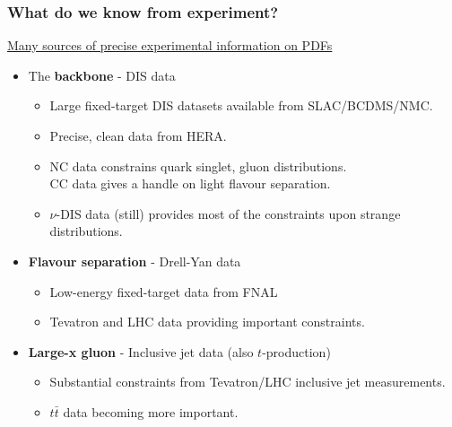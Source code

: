 \documentclass[10pt]{beamer}
\begin{document}
\begin{frame}
\frametitle{What do we know from experiment?}
\small\underline{Many sources of precise experimental information on PDFs}
\vskip5pt

\begin{itemize}
\item The \textbf{backbone} - DIS data

\begin{itemize}
\item Large fixed-target DIS datasets available from SLAC/BCDMS/NMC.
\item Precise, clean data from HERA.
\item NC data constrains quark singlet, gluon distributions. \\CC data gives a handle on light flavour separation.
\item $\nu$-DIS data (still) provides most of the constraints upon strange distributions.
\end{itemize}
\vskip5pt

\item \textbf{Flavour separation} - Drell-Yan data

\begin{itemize}
\item Low-energy fixed-target data from FNAL
\item Tevatron and LHC data providing important constraints.
\end{itemize}
\vskip5pt
\item \textbf{Large-x gluon} - Inclusive jet data (also $t$-production)

\begin{itemize}
\item Substantial constraints from Tevatron/LHC inclusive jet measurements.
\item $t\bar{t}$ data becoming more important.
\end{itemize}

\end{itemize}
\end{frame}
\end{document}
